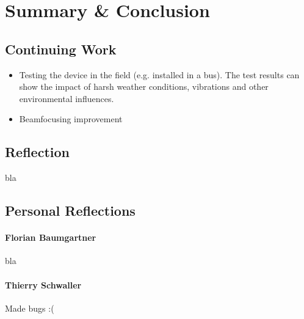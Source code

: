 \chapter{Summary \& Conclusion}

\section{Continuing Work}


\begin{itemize}
		\item Testing the device in the field (e.g. installed in a bus). The test results can show the impact of harsh weather conditions, vibrations and other environmental influences.
		\item Beamfocusing improvement
\end{itemize}

\newpage
\section{Reflection}
bla

\section{Personal Reflections}

\subsubsection{Florian Baumgartner}
bla

\subsubsection{Thierry Schwaller}
Made bugs :(